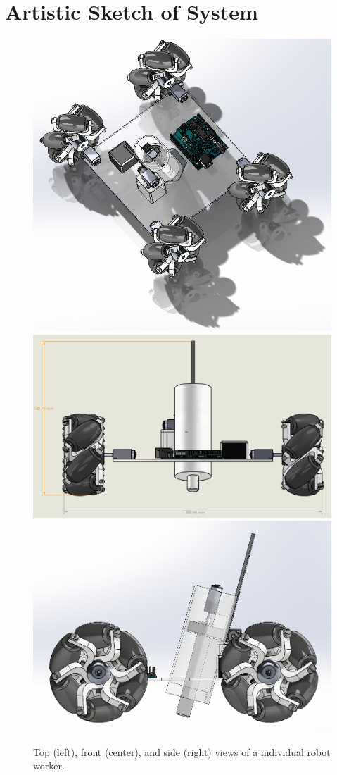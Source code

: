 
\section{Artistic Sketch of System}
\label{sec:artistic_sketch}


\begin{figure}
 \centering
 	\includegraphics[width=0.32\columnwidth]{CAD-screen-shots/full-assembly-5.png}
    \includegraphics[width=0.32\columnwidth]{CAD-screen-shots/full-assembly-3.png}
    \includegraphics[width=0.32\columnwidth]{CAD-screen-shots/full-assembly-4.png}
	\caption{Top (left), front (center), and side (right) views of a individual robot worker.}
 \label{fig:full-robot}
\end{figure}

